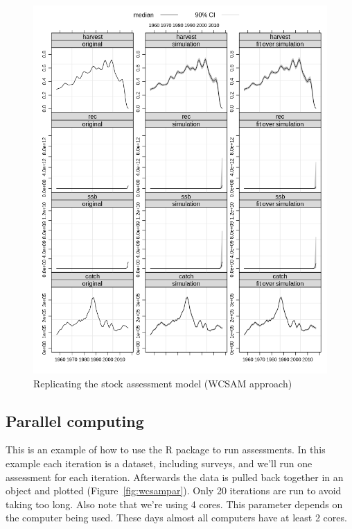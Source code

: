 \documentclass[a4paper,english,10pt]{article}\usepackage[]{graphicx}\usepackage[]{color}
\newenvironment{knitrout}{}{} %
\begin{document}
\begin{knitrout}
\color{fgcolor}\begin{figure}[H]

{\centering \includegraphics[width=.9\linewidth]{figure/wcsam-1} 

}

\caption[Replicating the stock assessment model (WCSAM approach)]{Replicating the stock assessment model (WCSAM approach)}\label{fig:wcsam}
\end{figure}


\end{knitrout}

\subsection{Parallel computing}

This is an example of how to use the  R package to run assessments. In this example each iteration is a dataset, including surveys, and we'll run one assessment for each iteration. Afterwards the data is pulled back together in an  object and plotted (Figure~\ref{fig:wcsampar}). Only 20 iterations are run to avoid taking too long. Also note that we're using 4 cores. This parameter depends on the computer being used. These days almost all computers have at least 2 cores.
\end{document}
